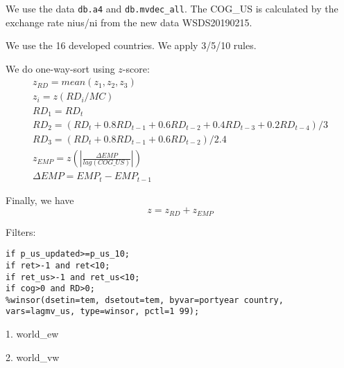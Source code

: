

\usepackage[T1]{fontenc}




\thispagestyle{fancy}

\newcommand{\code}{\texttt}
\newcommand*{\Commonpath}{20190220/lagcog_us-developed}


We use the data \code{db.a4} and \code{db.mvdec\_all}. The COG\_US is calculated by the exchange rate nius/ni from the new data WSDS20190215.

We use the 16 developed countries.
We apply 3/5/10 rules.



We do one-way-sort using $z$-score:
$$
\begin{aligned}
& z_{RD} = mean(z_1, z_2, z_3) \\
& z_i = z(RD_i/MC) \\
& RD_1 = RD_t \\
& RD_2 = (RD_t + 0.8RD_{t-1} + 0.6RD_{t-2} + 0.4RD_{t-3} + 0.2RD_{t-4})/3 \\
& RD_3 = (RD_t + 0.8RD_{t-1} + 0.6RD_{t-2})/2.4 
& \\
& z_{EMP} = z(|\frac{\Delta EMP}{lag(COG\_US)}|) \\
& \Delta EMP = EMP_t - EMP_{t-1}
\end{aligned}
$$

Finally, we have
$$
z = z_{RD} + z_{EMP}
$$


Filters:

\code{if p\_us\_updated>=p\_us\_10;} \\
\code{if ret>-1 and ret<10;} \\
\code{if ret\_us>-1 and ret\_us<10;} \\
\code{if cog>0 and RD>0;} \\
\code{\%winsor(dsetin=tem, dsetout=tem, byvar=portyear country, vars=lagmv\_us, type=winsor, pctl=1 99);}

\small


1. world\_ew


2. world\_vw





